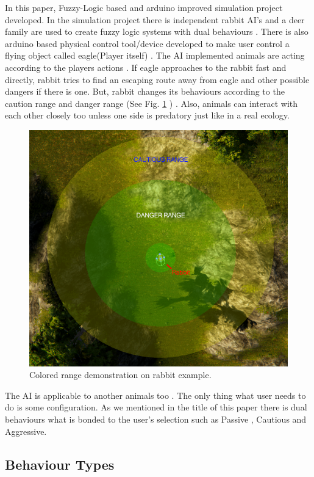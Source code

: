 In this paper, Fuzzy-Logic based and arduino improved simulation project developed. In the simulation project there is independent rabbit AI's and a deer family are used to create fuzzy logic systems with dual behaviours . There is also arduino based physical control tool/device developed to make user control a flying object called eagle(Player itself)  . The AI implemented animals are acting according to the players actions . If eagle approaches to the rabbit fast and directly, rabbit tries to find an escaping route away from eagle and other possible dangers if there is one. But, rabbit changes its behaviours according to the caution range and danger range (See Fig. \ref{fig:range} ) . Also, animals can interact with each other closely too unless one side is predatory just like in a real ecology.


\begin{figure}[ht]
    \centering
    \includegraphics[scale=.45]{Images/range_rabbit_edited.png}
    \caption{Colored range demonstration on rabbit example. }
    \label{fig:range}
\end{figure}


The AI is applicable to another animals too . The only thing what user needs to do is some configuration. As we mentioned in the title of this paper there is dual behaviours what is bonded to the user's selection such as Passive , Cautious and Aggressive.

\subsection{Behaviour Types} \label{behaviour_types}



